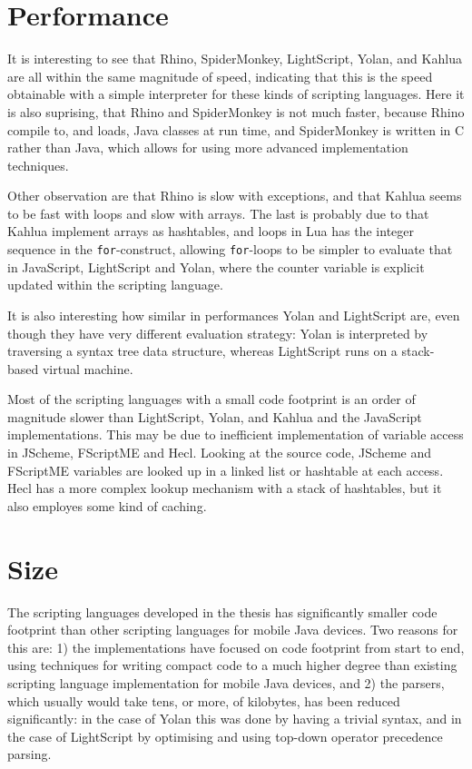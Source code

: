 \documentclass[11pt]{report}
\begin{document}
\section{Performance}
It is interesting to see that Rhino, SpiderMonkey, LightScript, Yolan, and Kahlua are all within the same magnitude of speed, indicating that this is the speed obtainable with a simple interpreter for these kinds of scripting languages. Here it is also suprising, that Rhino and SpiderMonkey is not much faster, because Rhino compile to, and loads, Java classes at run time, and SpiderMonkey is written in C rather than Java, which allows for using more advanced implementation techniques.

Other observation are that Rhino is slow with exceptions, and that Kahlua seems to be fast with loops and slow with arrays. The last is probably due to that Kahlua implement arrays as hashtables, and loops in Lua has the integer sequence in the \verb|for|-construct, allowing \verb|for|-loops to be simpler to evaluate that in JavaScript, LightScript and Yolan, where the counter variable is explicit updated within the scripting language.

It is also interesting how similar in performances Yolan and LightScript are, even though they have very different evaluation strategy: Yolan is interpreted by traversing a syntax tree data structure, whereas LightScript runs on a stack-based virtual machine. 

Most of the scripting languages with a small code footprint is an order of magnitude slower than LightScript, Yolan, and Kahlua and the JavaScript implementations.
This may be due to inefficient implementation of variable access in JScheme, FScriptME and Hecl. Looking at the source code, JScheme and FScriptME variables are looked up in a linked list or hashtable at each access. Hecl has a more complex lookup mechanism with a stack of hashtables, but it also employes some kind of caching.

\section{Size}

The scripting languages developed in the thesis has significantly smaller code footprint than other scripting languages for mobile Java devices.
Two reasons for this are: 1) the implementations have focused on code footprint from start to end, using techniques for writing compact code to a much higher degree than existing scripting language implementation for mobile Java devices, and 2) the parsers, which usually would take tens, or more, of kilobytes, has been reduced significantly: in the case of Yolan this was done by having a trivial syntax, and in the case of LightScript by optimising and using top-down operator precedence parsing.
\end{document}
